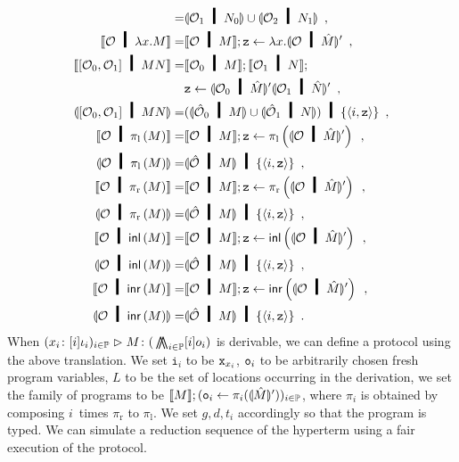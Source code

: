 {\begin{align*}
 =&\semi{\hypert_1 \hmid N_0}\cup \semi{\hypert_2 \hmid N_1}\enspace,\\
 \sem{\hypert\hmid \lambda x.M}=& \sem{\hypert\hmid M}; \p z\leftarrow
 \lambda x. \semi{\hypert\hmid\hat M}' \enspace,\\
 \sem{\cotuple{\hypert_0,\hypert_1}\hmid MN}=& \sem{\hypert_0\hmid M}; \sem{\hypert_1\hmid N}; \\&
 \p z\leftarrow \semi{\hypert_0\hmid \hat M}'\semi{\hypert_1\hmid \hat N}'\enspace,\\
 \semi{\cotuple{\hypert_0,\hypert_1}\hmid MN} =& (\semi{\hat \hypert_0 \hmid M}\cup
 \semi{\hat\hypert_1\hmid N})\hmid \{\tuple{i,\p z}\}\enspace, \\
 \sem{\hypert\hmid \lpil M} =& \sem{\hypert\hmid M}; \p z \leftarrow
 \lpil {\semi{\hypert\hmid\hat M}'}\enspace, \\
 \semi{\hypert\hmid \lpil M}=& \semi{\hat \hypert\hmid M}\hmid
 \{\tuple{i, \p z}\}\enspace, \\
 \sem{\hypert\hmid \lpir M} =& \sem{\hypert\hmid M}; \p z \leftarrow
 \lpir{ \semi{\hypert\hmid\hat M}' }\enspace, \\
 \semi{\hypert\hmid \lpir M}=& \semi{\hat \hypert\hmid M}\hmid
 \{\tuple{i, \p z}\}\enspace, \\
 \sem{\hypert\hmid \linl{M}} =& \sem{\hypert\hmid M}; \p z \leftarrow
 \linl{ \semi{\hypert\hmid\hat M}'}\enspace, \\
 \semi{\hypert\hmid \linl M}=& \semi{\hat \hypert\hmid M}\hmid
 \{\tuple{i, \p z}\}\enspace, \\
 \sem{\hypert\hmid \linr M} =& \sem{\hypert\hmid M}; \p z \leftarrow
 \linr{\semi{\hypert\hmid\hat M}'}\enspace, \\
 \semi{\hypert\hmid \linr{M}}=& \semi{\hat \hypert\hmid M}\hmid
 \{\tuple{i, \p z}\}\enspace.
\end{align*} }
When $({x_i} \colon{[i]\iota_i})_{i\in\mathbb{P}}
\vartriangleright{M} \colon{(}\operatorname*{\bigwedge\kern -8pt \bigwedge}_{i\in \mathbb{P}}[i]o_i)$ is
derivable,
we can define a protocol using the above translation.
We set $\mathtt i_i$ to be ${\texttt{x}}_{x_i}$, ${\texttt{o}}_i$ to be arbitrarily
chosen fresh program variables, $L$ to be the set of locations
occurring in the derivation, we set the family of programs to be
$\llbracket{M}\rrbracket; ({\texttt{o}}_i\leftarrow \pi_i(\llparenthesis{\hat M}\rrparenthesis'))_{i\in\mathbb{P}}$,
where $\pi_i$ is obtained by composing $i$~times $\pi_{\mathrm r}$ to
$\pi_{\mathrm l}$.
We set $g,d,t_i$ accordingly so that the program is typed.
We can simulate a reduction sequence of
the hyperterm using a fair execution of the protocol.


